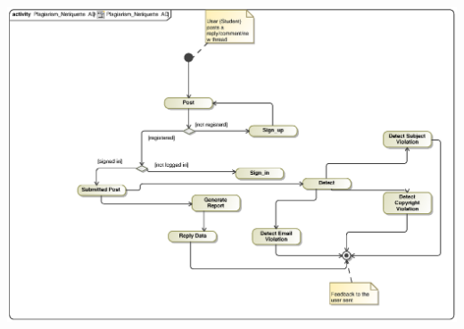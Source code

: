 \documentclass{scrreprt}
\begin{document}
\includegraphics[scale=.9]{HlavuteloPlagiarismNetiquetteAD.eps}\\
\end{document}
